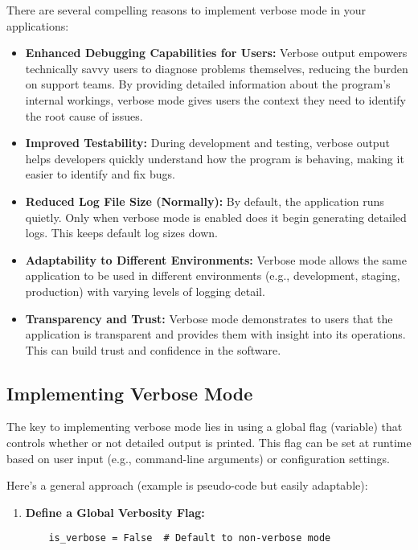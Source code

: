 \documentclass{article}
\begin{document}
{{{There are several compelling reasons to implement verbose mode in your applications:

\begin{itemize}
    \item \textbf{Enhanced Debugging Capabilities for Users:}  Verbose output empowers technically savvy users to diagnose problems themselves, reducing the burden on support teams. By providing detailed information about the program's internal workings, verbose mode gives users the context they need to identify the root cause of issues.
    \item \textbf{Improved Testability:} During development and testing, verbose output helps developers quickly understand how the program is behaving, making it easier to identify and fix bugs.
    \item \textbf{Reduced Log File Size (Normally):} By default, the application runs quietly.  Only when verbose mode is enabled does it begin generating detailed logs.  This keeps default log sizes down.
    \item \textbf{Adaptability to Different Environments:}  Verbose mode allows the same application to be used in different environments (e.g., development, staging, production) with varying levels of logging detail.
    \item \textbf{Transparency and Trust:} Verbose mode demonstrates to users that the application is transparent and provides them with insight into its operations. This can build trust and confidence in the software.
\end{itemize}

\subsection*{Implementing Verbose Mode}

The key to implementing verbose mode lies in using a global flag (variable) that controls whether or not detailed output is printed. This flag can be set at runtime based on user input (e.g., command-line arguments) or configuration settings.

Here's a general approach (example is pseudo-code but easily adaptable):

\begin{enumerate}
    \item \textbf{Define a Global Verbosity Flag:}
    \begin{verbatim}
    is_verbose = False  # Default to non-verbose mode
    \end{verbatim}


\end{enumerate}}}}
\end{document}
